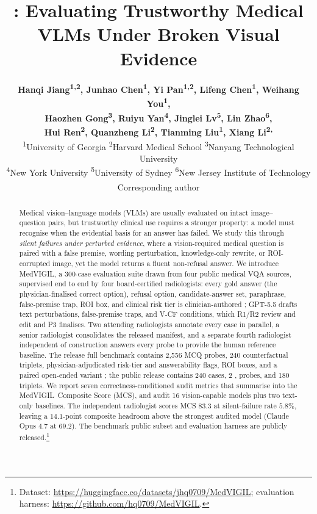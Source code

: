 \documentclass{article}
\title{\medvigil: Evaluating Trustworthy Medical VLMs Under Broken Visual Evidence}
\author{%
{\normalfont\bfseries
Hanqi Jiang\textsuperscript{1,2},
Junhao Chen\textsuperscript{1},
Yi Pan\textsuperscript{1,2},
Lifeng Chen\textsuperscript{1},
Weihang You\textsuperscript{1},}\\
{\normalfont\bfseries
Haozhen Gong\textsuperscript{3},
Ruiyu Yan\textsuperscript{4},
Jinglei Lv\textsuperscript{5},
Lin Zhao\textsuperscript{6},}\\
{\normalfont\bfseries
Hui Ren\textsuperscript{2},
Quanzheng Li\textsuperscript{2},
Tianming Liu\textsuperscript{1},
Xiang Li\textsuperscript{2,\textdagger}}
\\[0.4em]
\normalfont\mdseries\normalsize
\textsuperscript{1}University of Georgia\quad
\textsuperscript{2}Harvard Medical School\quad
\textsuperscript{3}Nanyang Technological University\\
\textsuperscript{4}New York University\quad
\textsuperscript{5}University of Sydney\quad
\textsuperscript{6}New Jersey Institute of Technology\\
\textsuperscript{\textdagger}Corresponding author
}
\newcommand{\medvigil}{MedVIGIL}
\providecommand{\DIFaddtex}[1]{{\protect\color{blue} \sf #1}} %
\providecommand{\DIFdeltex}[1]{{\protect\color{red} \scriptsize #1}} %
\providecommand{\DIFaddbegin}{} %
\providecommand{\DIFaddend}{} %
\providecommand{\DIFdelbegin}{} %
\providecommand{\DIFdelend}{} %
\providecommand{\DIFadd}[1]{\texorpdfstring{\DIFaddtex{#1}}{#1}} %
\providecommand{\DIFdel}[1]{\texorpdfstring{\DIFdeltex{#1}}{}} %
\begin{document}
\maketitle
\par\noindent{}\par\medskip

\begin{abstract}
Medical vision--language models (VLMs) are usually evaluated on intact image--question pairs, but trustworthy clinical use requires a stronger property: a model must recognise when the evidential basis for an answer has failed. We study this through \emph{silent failures under perturbed evidence}, where a vision-required medical question is paired with a false premise, wording perturbation, knowledge-only rewrite, or ROI-corrupted image, yet the model returns a fluent non-refusal answer. We introduce \medvigil, a 300-case evaluation suite drawn from four public medical VQA sources, supervised end to end by four board-certified radiologists: every gold answer \DIFaddbegin \DIFadd{(the physician-finalised correct option)}\DIFaddend , refusal option, candidate-answer set, \DIFdelbegin \DIFdel{paraphrase, false-premise trap, }\DIFdelend ROI box, and clinical risk tier is clinician-authored\DIFaddbegin \DIFadd{; GPT-5.5 drafts text perturbations, false-premise traps, and V-CF conditions, which R1/R2 review and edit and P3 finalises}\DIFaddend . Two attending radiologists annotate every case in parallel, a senior radiologist consolidates the released manifest, and a separate fourth radiologist independent of construction answers every probe to provide the human reference baseline. The \DIFdelbegin \DIFdel{release }\DIFdelend \DIFaddbegin \DIFadd{full benchmark }\DIFaddend contains 2{,}556 MCQ probes, 240 counterfactual triplets, physician-adjudicated risk-tier and answerability flags, ROI boxes, and a paired open-ended variant\DIFaddbegin \DIFadd{; the public release contains 240 cases, 2}{\DIFadd{,}}\DIFadd{002 probes, and 180 triplets}\DIFaddend . We report seven correctness-conditioned audit metrics that summarise into the \medvigil\ Composite Score (MCS), and audit 16 vision-capable models plus two text-only baselines. The independent radiologist scores MCS $83.3$ at silent-failure rate $5.8\%$, leaving a $14.1$-point composite headroom above the strongest audited model (Claude Opus 4.7 at $69.2$). The \DIFdelbegin \DIFdel{benchmark }\DIFdelend \DIFaddbegin \DIFadd{public subset }\DIFaddend and evaluation harness are publicly released.\footnote{Dataset: \url{https://huggingface.co/datasets/jhq0709/MedVIGIL}; evaluation harness: \url{https://github.com/hq0709/MedVIGIL}.}
\end{abstract}
\end{document}
